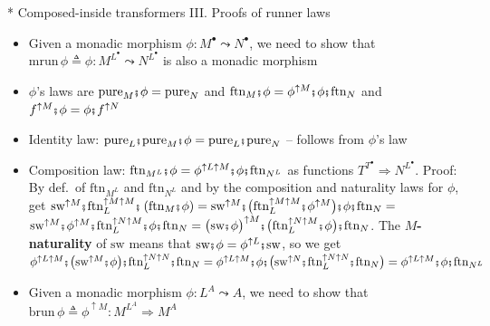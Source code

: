 \documentclass[english]{beamer}
\newcommand{\bef}{\hspace{0.5pt}\ensuremath\mathsmaller{\fatsemi}\hspace{1.5pt}}
\begin{document}
\begin{frame}{{*} Composed-inside transformers III. Proofs of runner laws}
\begin{itemize}
\item {\footnotesize{}\vspace{-0.15cm}}Given a monadic morphism $\phi:M^{\bullet}\leadsto N^{\bullet}$,
we need to show that $\text{mrun}\,\phi\triangleq\phi:M^{L^{\bullet}}\leadsto N^{L^{\bullet}}$
is also a monadic morphism
\item {\footnotesize{}$\phi$'s laws are $\text{pure}_{M}\bef\phi=\text{pure}_{N}$
and $\text{ftn}_{M}\bef\phi=\phi^{\uparrow M}\bef\phi\bef\text{ftn}_{N}$
and $f^{\uparrow M}\bef\phi=\phi\bef f^{\uparrow N}$}{\footnotesize\par}
\item {\footnotesize{}Identity law: $\text{pure}_{L}\bef\text{pure}_{M}\bef\phi=\text{pure}_{L}\bef\text{pure}_{N}$
-- follows from $\phi$'s law}{\footnotesize\par}
\item {\footnotesize{}\vspace{-0.1cm}Composition law: $\text{ftn}_{M^{L}}\bef\phi=\phi^{\uparrow L\uparrow M}\bef\phi\bef\text{ftn}_{N^{L}}$
as functions $T^{T^{\bullet}}\Rightarrow N^{L^{\bullet}}$. Proof:
By def.~of $\text{ftn}_{M^{L}}$ and $\text{ftn}_{N^{L}}$ and by
the composition and naturality laws for $\phi$, get $\text{sw}^{\uparrow M}\bef\text{ftn}_{L}^{\uparrow M\uparrow M}\bef\left(\text{ftn}_{M}\bef\phi\right)=\text{sw}^{\uparrow M}\bef\big(\text{ftn}_{L}^{\uparrow M\uparrow M}\bef\phi^{\uparrow M}\big)\bef\phi\bef\text{ftn}_{N}=$
$\text{sw}^{\uparrow M}\bef\phi^{\uparrow M}\bef\text{ftn}_{L}^{\uparrow N\uparrow M}\bef\phi\bef\text{ftn}_{N}=\big(\text{sw}\bef\phi\big)^{\uparrow M}\bef\big(\text{ftn}_{L}^{\uparrow N\uparrow M}\bef\phi\big)\bef\text{ftn}_{N}$.
The $M$}\textbf{\footnotesize{}-naturality}{\footnotesize{} of $\text{sw}$
means that $\text{sw}\bef\phi=\phi^{\uparrow L}\bef\text{sw}$, so
we get $\phi^{\uparrow L\uparrow M}\bef\big(\text{sw}^{\uparrow M}\bef\phi\big)\bef\text{ftn}_{L}^{\uparrow N\uparrow N}\bef\text{ftn}_{N}=\phi^{\uparrow L\uparrow M}\bef\phi\bef\big(\text{sw}^{\uparrow N}\bef\text{ftn}_{L}^{\uparrow N\uparrow N}\bef\text{ftn}_{N}\big)=\phi^{\uparrow L\uparrow M}\bef\phi\bef\text{ftn}_{N^{L}}$}{\footnotesize\par}
\item {\footnotesize{}\vspace{-0.1cm}}Given a monadic morphism $\phi:L^{A}\leadsto A$,
we need to show that $\text{brun}\,\phi\triangleq\phi^{\uparrow M}:M^{L^{A}}\Rightarrow M^{A}$

\end{itemize}
\end{frame}
\end{document}
